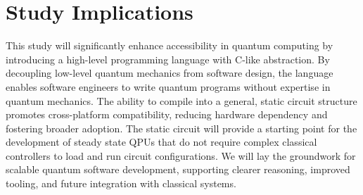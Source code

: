 \documentclass[journal,onecolumn, compsoc]{IEEEtran}
\begin{document}
\section{Study Implications}
This study will significantly enhance accessibility in quantum computing by introducing a high-level programming language with C-like abstraction. 
By decoupling low-level quantum mechanics from software design, the language enables software engineers to write quantum programs without expertise in quantum mechanics. 
The ability to compile into a general, static circuit structure promotes cross-platform compatibility, reducing hardware dependency and fostering broader adoption. 
The static circuit will provide a starting point for the development of steady state QPUs that do not require complex classical controllers to load and run circuit configurations.
We will lay the groundwork for scalable quantum software development, supporting clearer reasoning, improved tooling, and future integration with classical systems. 



\end{document}
